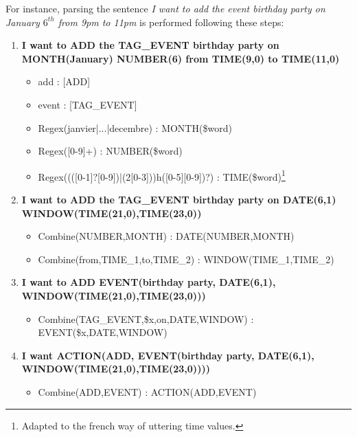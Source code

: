 				For instance, parsing the sentence \textit{I want to add the event birthday party on January $6^{th}$ from 9pm to 11pm} is performed following these steps:
                
                \begin{enumerate}
            	\item \textbf{I want to ADD the TAG\_EVENT birthday party on MONTH(January) NUMBER(6) from TIME(9,0) to TIME(11,0)}
                	\begin{itemize}
                    	\item add : [ADD]
                        \item event : [TAG\_EVENT]
                        \item Regex(janvier|...|decembre) : MONTH(\$word)
                        \item Regex([0-9]+) : NUMBER(\$word)
                        \item Regex((([0-1]?[0-9])|(2[0-3]))h([0-5][0-9])?) : TIME(\$word)\footnote{Adapted to the french way of uttering time values.}
                    \end{itemize}
              	\item \textbf{I want to ADD the TAG\_EVENT birthday party on DATE(6,1) \\ WINDOW(TIME(21,0),TIME(23,0))}
                	\begin{itemize}
                    	\item Combine(NUMBER,MONTH) : DATE(NUMBER,MONTH)
                        \item Combine(from,TIME\_1,to,TIME\_2) : WINDOW(TIME\_1,TIME\_2)
                    \end{itemize}
              	\item \textbf{I want to ADD EVENT(birthday party, DATE(6,1), \\ WINDOW(TIME(21,0),TIME(23,0)))}
                	\begin{itemize}
                    	\item Combine(TAG\_EVENT,\$x,on,DATE,WINDOW) : EVENT(\$x,DATE,WINDOW)
                    \end{itemize}
               	\item \textbf{I want ACTION(ADD, EVENT(birthday party, DATE(6,1), \\ WINDOW(TIME(21,0),TIME(23,0))))}
                	\begin{itemize}
                    	\item Combine(ADD,EVENT) : ACTION(ADD,EVENT)
                    \end{itemize}
            \end{enumerate}
            
